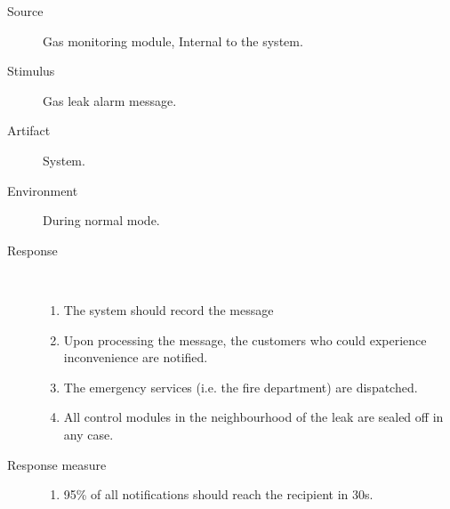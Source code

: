 \begin{description}
	\item[Source] Gas monitoring module, Internal to the system.
	\item[Stimulus] Gas leak alarm message.
	\item[Artifact] System.
	\item[Environment] During normal mode.
	\item[Response] \
		\begin{enumerate}
		  \item The system should record the message
		  \item Upon processing the message, the customers who could experience
		  inconvenience are notified.
		  \item The emergency services (i.e. the fire department) are dispatched.
		  \item All control modules in the neighbourhood of the leak are sealed off in
		  any case.
		\end{enumerate}
	\item[Response measure] 
	\begin{enumerate}
	  \item 95\% of all notifications should reach the recipient in 30s. 
	\end{enumerate}
\end{description}